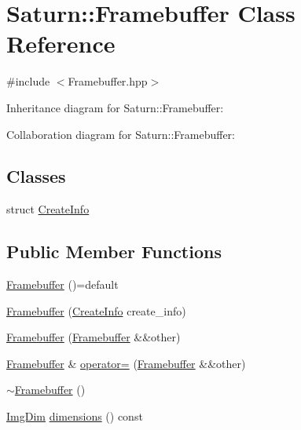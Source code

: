 \hypertarget{class_saturn_1_1_framebuffer}{}\section{Saturn\+:\+:Framebuffer Class Reference}
\label{class_saturn_1_1_framebuffer}


{\ttfamily \#include $<$Framebuffer.\+hpp$>$}



Inheritance diagram for Saturn\+:\+:Framebuffer\+:


Collaboration diagram for Saturn\+:\+:Framebuffer\+:
\subsection*{Classes}
\begin{DoxyCompactItemize}
\item 
struct \mbox{\hyperlink{struct_saturn_1_1_framebuffer_1_1_create_info}{Create\+Info}}
\end{DoxyCompactItemize}
\subsection*{Public Member Functions}
\begin{DoxyCompactItemize}
\item 
\mbox{\hyperlink{class_saturn_1_1_framebuffer_afae1e890e24c1d1f93fb5393e44449d7}{Framebuffer}} ()=default
\item 
\mbox{\hyperlink{class_saturn_1_1_framebuffer_af844fab5ccc3d5cf67aeadc162696f63}{Framebuffer}} (\mbox{\hyperlink{struct_saturn_1_1_framebuffer_1_1_create_info}{Create\+Info}} create\+\_\+info)
\item 
\mbox{\hyperlink{class_saturn_1_1_framebuffer_ac2f02f4dd4d1b74ce884e796f2b8d09a}{Framebuffer}} (\mbox{\hyperlink{class_saturn_1_1_framebuffer}{Framebuffer}} \&\&other)
\item 
\mbox{\hyperlink{class_saturn_1_1_framebuffer}{Framebuffer}} \& \mbox{\hyperlink{class_saturn_1_1_framebuffer_af06c7bf1180664e722398d337ed6c0cf}{operator=}} (\mbox{\hyperlink{class_saturn_1_1_framebuffer}{Framebuffer}} \&\&other)
\item 
\mbox{\hyperlink{class_saturn_1_1_framebuffer_ab115fd5af6b25c845116f0fa795fe8c8}{$\sim$\+Framebuffer}} ()
\item 
\mbox{\hyperlink{namespace_saturn_a8bd2b855a967447c8314c235470e0987}{Img\+Dim}} \mbox{\hyperlink{class_saturn_1_1_framebuffer_a1214cd06164db912593d564b0c878c5c}{dimensions}} () const
\end{DoxyCompactItemize}
